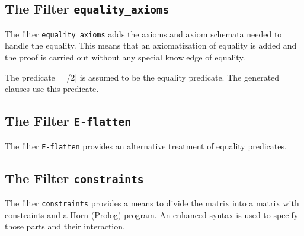 \subsection{The Filter {\tt equality\_axioms}}

The filter {\tt equality\_axioms} adds the axioms and axiom schemata needed to
handle the equality. This means that an axiomatization of equality is added
and the proof is carried out without any special knowledge of equality.

The predicate |=/2| is assumed to be the equality predicate. The generated
clauses use this predicate.



\subsection{The Filter {\tt E-flatten}}

The filter {\tt E-flatten} provides an alternative treatment of equality
predicates.


\subsection{The Filter {\tt constraints}}

The filter {\tt constraints} provides a means to divide the matrix into a
matrix with constraints and a Horn-(Prolog) program. An enhanced syntax is
used to specify those parts and their interaction.



